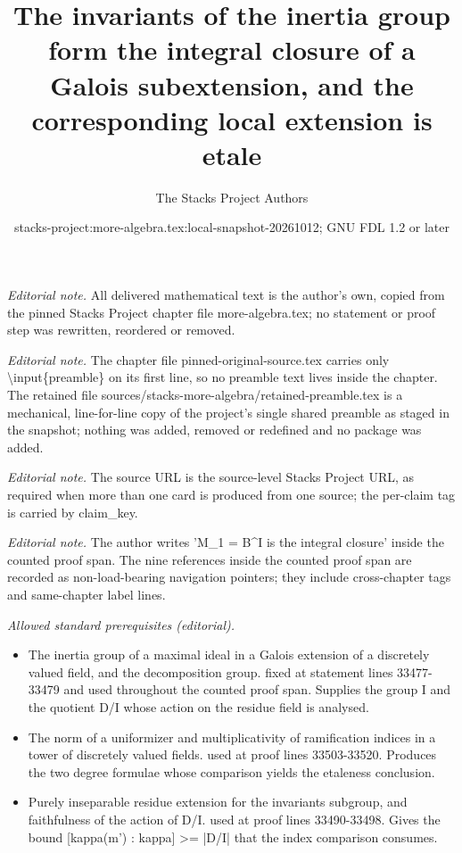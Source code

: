 \documentclass[10pt,a4paper]{amsart}
\title{The invariants of the inertia group form the integral closure of a Galois subextension, and the corresponding local extension is etale}
\author{The Stacks Project Authors}
\date{stacks-project:more-algebra.tex:local-snapshot-20261012; GNU FDL 1.2 or later}
\theoremstyle{plain}
\theoremstyle{definition}
\theoremstyle{remark}
\numberwithin{equation}{subsection}
\begin{document}
\maketitle
\setcounter{subsection}{1}
\noindent\textit{Editorial note.} All delivered mathematical text is the author's own, copied from the pinned Stacks Project chapter file more-algebra.tex; no statement or proof step was rewritten, reordered or removed.\par\medskip
\noindent\textit{Editorial note.} The chapter file pinned-original-source.tex carries only \textbackslash{}input\{preamble\} on its first line, so no preamble text lives inside the chapter. The retained file sources/stacks-more-algebra/retained-preamble.tex is a mechanical, line-for-line copy of the project's single shared preamble as staged in the snapshot; nothing was added, removed or redefined and no package was added.\par\medskip
\noindent\textit{Editorial note.} The source URL is the source-level Stacks Project URL, as required when more than one card is produced from one source; the per-claim tag is carried by claim\_key.\par\medskip
\noindent\textit{Editorial note.} The author writes 'M\_1 = B\textasciicircum{}I is the integral closure' inside the counted proof span. The nine references inside the counted proof span are recorded as non-load-bearing navigation pointers; they include cross-chapter tags and same-chapter label lines.\par\medskip
\noindent\textit{Allowed standard prerequisites (editorial).}\begin{itemize}
\item The inertia group of a maximal ideal in a Galois extension of a discretely valued field, and the decomposition group. fixed at statement lines 33477-33479 and used throughout the counted proof span. Supplies the group I and the quotient D/I whose action on the residue field is analysed.
\item The norm of a uniformizer and multiplicativity of ramification indices in a tower of discretely valued fields. used at proof lines 33503-33520. Produces the two degree formulae whose comparison yields the etaleness conclusion.
\item Purely inseparable residue extension for the invariants subgroup, and faithfulness of the action of D/I. used at proof lines 33490-33498. Gives the bound [kappa(m') : kappa] >= |D/I| that the index comparison consumes.
\end{itemize}\medskip
\end{document}
